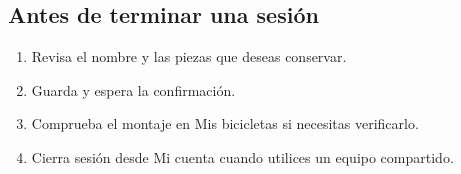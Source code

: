 \documentclass[12pt,letterpaper]{article}
\begin{document}
\subsection{Antes de terminar una sesión}
\begin{enumerate}
\item Revisa el nombre y las piezas que deseas conservar.
\item Guarda y espera la confirmación.
\item Comprueba el montaje en Mis bicicletas si necesitas verificarlo.
\item Cierra sesión desde Mi cuenta cuando utilices un equipo compartido.
\end{enumerate}
\end{document}
